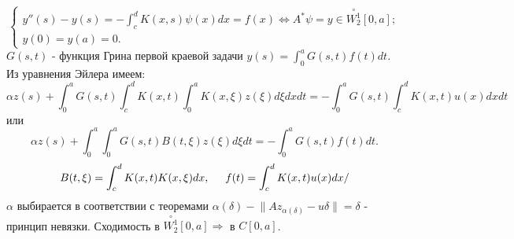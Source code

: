 \documentclass{article}
\begin{document}
\[
\begin{cases}
y''(s) - y(s) = - \int_c^d K(x,s) \psi(x)dx = f(x)  \Leftrightarrow A^* \psi = y \in \overset{\circ}{W_2^1}[0,a]; \\
y(0) = y(a) = 0.
\end{cases}
\]
$G(s,t)$ - функция Грина первой краевой задачи $y(s) = \int_0^a G(s,t) f(t) dt$. Из уравнения Эйлера имеем:
\[
\alpha z(s) + \int_0^a G(s,t) \int_c^d K(x,t) \int_0^a K(x,\xi) z(\xi) d\xi dx dt = 
- \int_0^a G(s,t) \int_c^d K(x,t) u(x) dx dt
\]
или
\[
\alpha z(s) + \int_0^a \int_0^a G(s,t) B(t,\xi) z(\xi) d\xi dt = -\int_0^a G(s,t) f(t)dt.
\]
\[
B(t,\xi) = \int_c^d K(x,t) K(x, \xi) dx, \hspace{0.5cm} f(t) = \int_c^d K(x,t) u(x) dx/
\]
$\alpha$ выбирается в соответствии с теоремами $\alpha(\delta) - \lVert A z_{\alpha(\delta)} - u \delta \rVert = \delta$ - принцип невязки. Сходимость в  $\overset{\circ}{W_2^1}[0,a] \Rightarrow$ в $C[0,a]$.
\end{document}
